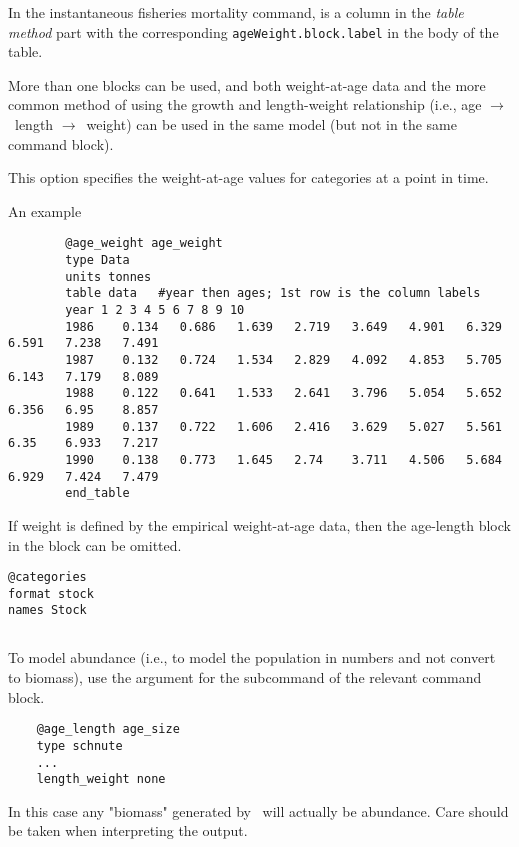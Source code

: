In the instantaneous fisheries mortality command,  is a column in the \textit{table method} part with the corresponding \texttt{ageWeight.block.label} in the body of the table. 

More than one  blocks can be used, and both weight-at-age data and the more common method of using the growth and length-weight relationship (i.e., age $\rightarrow$\ length $\rightarrow$\ weight) can be used in the same model (but not in the same command block).

This option specifies the weight-at-age values for categories at a point in time.

An example

{\small{\begin{verbatim}
		@age_weight age_weight
		type Data
		units tonnes
		table data   #year then ages; 1st row is the column labels
		year 1 2 3 4 5 6 7 8 9 10
		1986	0.134	0.686	1.639	2.719	3.649	4.901	6.329	6.591	7.238	7.491
		1987	0.132	0.724	1.534	2.829	4.092	4.853	5.705	6.143	7.179	8.089
		1988	0.122	0.641	1.533	2.641	3.796	5.054	5.652	6.356	6.95	8.857
		1989	0.137	0.722	1.606	2.416	3.629	5.027	5.561	6.35	6.933	7.217
		1990	0.138	0.773	1.645	2.74	3.711	4.506	5.684	6.929	7.424	7.479
		end_table
\end{verbatim}}}

If weight is defined by the empirical weight-at-age data, then the age-length block in the  block can be omitted.

{\small{\begin{verbatim}
@categories
format stock
names Stock
\end{verbatim}}}

\subsection{\label{sec:weightless-model}}

To model abundance (i.e., to model the population in numbers and not convert to biomass), use the argument  for the subcommand  of the relevant   command block.

{\small{\begin{verbatim}
	@age_length age_size
	type schnute
	...
	length_weight none
	\end{verbatim}}}

In this case any "biomass" generated by \CNAME\ will actually be abundance. Care should be taken when interpreting the output.
\fi %

